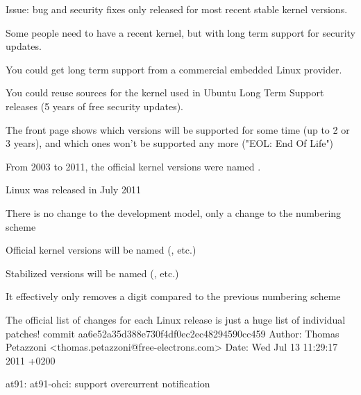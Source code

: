 
    \startitemize
    \item Issue: bug and security fixes only released for most recent
      stable kernel versions.
    \item Some people need to have a recent kernel, but with long term
      support for security updates.
    \item You could get long term support from a commercial embedded
      Linux provider.
    \item You could reuse sources for the kernel used in Ubuntu Long
      Term Support releases (5 years of free security updates).
    \item The  front page shows which 
      versions will be supported for some time (up to 2 or 3 years),
      and which ones won't be supported any more ("EOL: End Of Life")
    \stopitemize


  \startitemize
  \item From 2003 to 2011, the official kernel versions were named .
  \item Linux  was released in July 2011
  \item There is no change to the development model, only a change to
    the numbering scheme
    \startitemize
    \item Official kernel versions will be named 
      (, etc.)
    \item Stabilized versions will be named 
      (, etc.)
    \item It effectively only removes a digit compared to the previous
      numbering scheme
    \stopitemize
  \stopitemize

  \startitemize
  \item The official list of changes for each Linux release is just a
    huge list of individual patches!
    \starttyping
commit aa6e52a35d388e730f4df0ec2ec48294590cc459
Author: Thomas Petazzoni <thomas.petazzoni@free-electrons.com>
Date:   Wed Jul 13 11:29:17 2011 +0200

    at91: at91-ohci: support overcurrent notification

